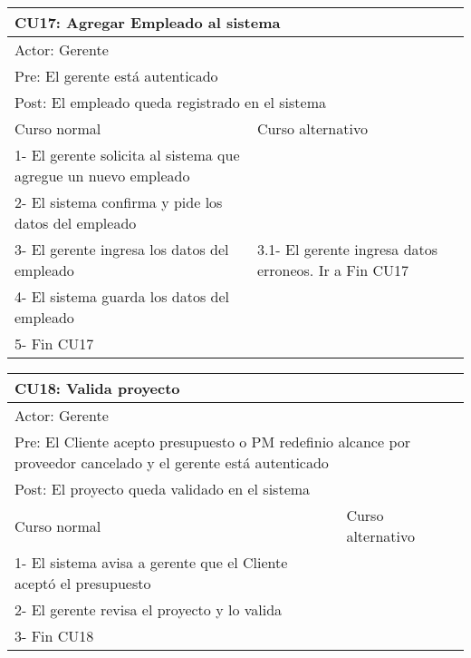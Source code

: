\begin{table}[H]
  \begin{adjustbox}{max width = \textwidth}
  \begin{tabular}{|l|l|}
    \hline
    \multicolumn{2}{|l|}{CU17: Agregar Empleado al sistema} \\\hline
    \multicolumn{2}{|l|}{Actor: Gerente} \\\hline
    \multicolumn{2}{|l|}{Pre: El gerente está autenticado} \\\hline
    \multicolumn{2}{|l|}{Post: El empleado queda registrado en el sistema} \\\hline
     Curso normal & Curso alternativo\\ \hline
	 1- El gerente solicita al sistema que agregue un nuevo empleado & \\ \hline
	 2- El sistema confirma y pide los datos del empleado & \\ \hline
	 3- El gerente ingresa los datos del empleado & 3.1- El gerente ingresa datos erroneos. Ir a Fin CU17\\ \hline
   4- El sistema guarda los datos del empleado & \\ \hline
   5- Fin CU17 & \\ \hline
  \end{tabular}
  \end{adjustbox}
\end{table}

\begin{table}[H]
  \begin{adjustbox}{max width = \textwidth}
  \begin{tabular}{|l|l|}
    \hline
    \multicolumn{2}{|l|}{CU18: Valida proyecto} \\\hline
    \multicolumn{2}{|l|}{Actor: Gerente} \\\hline
    \multicolumn{2}{|l|}{Pre: El Cliente acepto presupuesto o PM redefinio alcance por proveedor cancelado y el gerente está autenticado} \\\hline
    \multicolumn{2}{|l|}{Post: El proyecto queda validado en el sistema} \\\hline
     Curso normal & Curso alternativo\\ \hline
	 1- El sistema avisa a gerente que el Cliente aceptó el presupuesto & \\ \hline
	 2- El gerente revisa el proyecto y lo valida & \\ \hline
   3- Fin CU18 & \\ \hline
  \end{tabular}
  \end{adjustbox}
\end{table}

